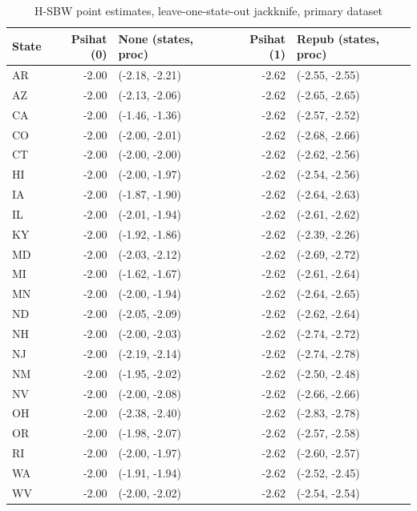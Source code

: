 \documentclass[12pt]{article}
\begin{document}
\begin{table}[ht]
\centering
\begin{tabular}{lrlrl}
  \toprule
State & Psihat (0) & None (states, proc) & Psihat (1) & Repub (states, proc) \\ 
  \midrule
AR & -2.00 & (-2.18, -2.21) & -2.62 & (-2.55, -2.55) \\ 
  AZ & -2.00 & (-2.13, -2.06) & -2.62 & (-2.65, -2.65) \\ 
  CA & -2.00 & (-1.46, -1.36) & -2.62 & (-2.57, -2.52) \\ 
  CO & -2.00 & (-2.00, -2.01) & -2.62 & (-2.68, -2.66) \\ 
  CT & -2.00 & (-2.00, -2.00) & -2.62 & (-2.62, -2.56) \\ 
  HI & -2.00 & (-2.00, -1.97) & -2.62 & (-2.54, -2.56) \\ 
  IA & -2.00 & (-1.87, -1.90) & -2.62 & (-2.64, -2.63) \\ 
  IL & -2.00 & (-2.01, -1.94) & -2.62 & (-2.61, -2.62) \\ 
  KY & -2.00 & (-1.92, -1.86) & -2.62 & (-2.39, -2.26) \\ 
  MD & -2.00 & (-2.03, -2.12) & -2.62 & (-2.69, -2.72) \\ 
  MI & -2.00 & (-1.62, -1.67) & -2.62 & (-2.61, -2.64) \\ 
  MN & -2.00 & (-2.00, -1.94) & -2.62 & (-2.64, -2.65) \\ 
  ND & -2.00 & (-2.05, -2.09) & -2.62 & (-2.62, -2.64) \\ 
  NH & -2.00 & (-2.00, -2.03) & -2.62 & (-2.74, -2.72) \\ 
  NJ & -2.00 & (-2.19, -2.14) & -2.62 & (-2.74, -2.78) \\ 
  NM & -2.00 & (-1.95, -2.02) & -2.62 & (-2.50, -2.48) \\ 
  NV & -2.00 & (-2.00, -2.08) & -2.62 & (-2.66, -2.66) \\ 
  OH & -2.00 & (-2.38, -2.40) & -2.62 & (-2.83, -2.78) \\ 
  OR & -2.00 & (-1.98, -2.07) & -2.62 & (-2.57, -2.58) \\ 
  RI & -2.00 & (-2.00, -1.97) & -2.62 & (-2.60, -2.57) \\ 
  WA & -2.00 & (-1.91, -1.94) & -2.62 & (-2.52, -2.45) \\ 
  WV & -2.00 & (-2.00, -2.02) & -2.62 & (-2.54, -2.54) \\ 
   \bottomrule
\end{tabular}
   \caption{H-SBW point estimates, leave-one-state-out jackknife, primary dataset}
    \label{tab:sensitivityc1}
\end{table}
\end{document}
